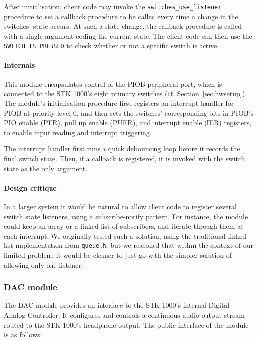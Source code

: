 \documentclass[a4paper,9pt]{article}
\newcommand{\isrc}[1]{\texttt{#1}}
\begin{document}
After initialisation, client code may invoke the
\isrc{switches\_use\_listener} procedure to set a callback procedure to be
called every time a change in the switches' state occurs. At such a state
change, the callback procedure is called with a single argument coding the
current state. The client code can then use the \isrc{SWITCH\_IS\_PRESSED} to
check whether or not a specific switch is active.

\paragraph{Internals}
This module encapsulates control of the PIOB peripheral port, which is
connected to the STK 1000's eight primary switches (cf.
Section~\ref{sec:hwsetup}). 
The module's initialisation procedure first registers an interrupt handler for
PIOB at priority level 0, and then sets the switches' corresponding bits in
PIOB's PIO enable (PER), pull up enable (PUER), and interrupt enable
(IER) registers, to enable input reading and interrupt triggering.

The interrupt handler first runs a quick debouncing loop before it records the
final switch state. Then, if a callback is registered, it is
invoked with the switch state as the only argument. 

\paragraph{Design critique}
In a larger system it would be natural to allow client code to register
several switch state listeners, using a subscribe-notify pattern. For
instance, the module could keep an array or a linked list of subscribers, and
iterate through them at each interrupt. We originally tested such a solution,
using the traditional linked list implementation from \texttt{queue.h}, but we
reasoned that within the context of our limited problem, it would be cleaner
to just go with the simpler solution of allowing only one listener. 


\subsubsection{DAC module}
The DAC module provides an interface to the STK 1000's internal
Digital-Analog-Controller. It configures and controls a continuous audio
output stream routed to the STK 1000's headphone output. The public
interface of the module is as follows:
\end{document}
